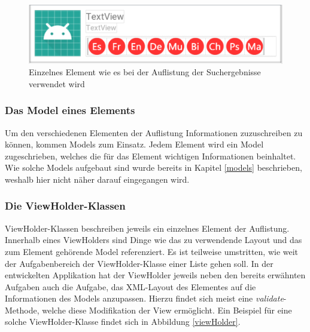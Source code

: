 \documentclass[../main.tex]{subfiles}
\begin{document}
	\begin{figure}
		\centering
		\includegraphics[width=\linewidth]{./images/Listelement.png}
		\caption{Einzelnes Element wie es bei der Auflistung der Suchergebnisse verwendet wird}
		\label{listElement}
	\end{figure}

	\subsubsection{Das Model eines Elements}
	Um den verschiedenen Elementen der Auflistung Informationen zuzuschreiben zu können, kommen Models zum Einsatz. Jedem Element wird ein Model zugeschrieben, welches die für das Element wichtigen Informationen beinhaltet. Wie solche Models aufgebaut sind wurde bereits in Kapitel \ref{models} beschrieben, weshalb hier nicht näher darauf eingegangen wird.
	
	\subsubsection{Die ViewHolder-Klassen}
	ViewHolder-Klassen beschreiben jeweils ein einzelnes Element der Auflistung. Innerhalb eines ViewHolders sind Dinge wie das zu verwendende Layout und das zum Element gehörende Model referenziert. Es ist teilweise umstritten, wie weit der Aufgabenbereich der ViewHolder-Klasse einer Liste gehen soll. In der entwickelten Applikation hat der ViewHolder jeweils neben den bereits erwähnten Aufgaben auch die Aufgabe, das XML-Layout des Elementes auf die Informationen des Models anzupassen. Hierzu findet sich meist eine \emph{validate}-Methode, welche diese Modifikation der View ermöglicht. Ein Beispiel für eine solche ViewHolder-Klasse findet sich in Abbildung \ref{viewHolder}.
\end{document}
